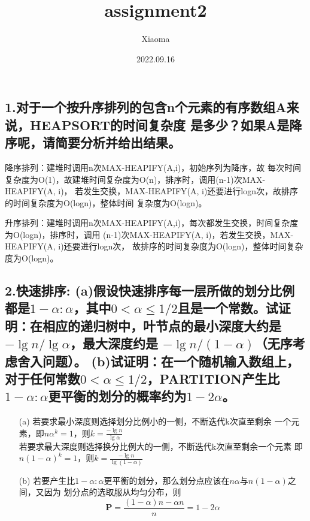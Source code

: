 \documentclass[12pt, a4paper, oneside]{ctexart}
\title{assignment2}
\author{Xiaoma}
\date{2022.09.16}
\begin{document}
\maketitle
\subsection*{1.对于一个按升序排列的包含n个元素的有序数组A来说，HEAPSORT的时间复杂度
是多少？如果A是降序呢，请简要分析并给出结果。}
    降序排列：建堆时调用n次MAX-HEAPIFY(A,i)，初始序列为降序，故
    每次时间复杂度为O(1)，故建堆时间复杂度为O(n)，排序时，调用(n-1)次MAX-HEAPIFY(A, i)，
    若发生交换，MAX-HEAPIFY(A, i)还要进行logn次，故排序的时间复杂度为O(logn)，整体时间
    复杂度为O(logn)。\\
    \par
    升序排列：建堆时调用n次MAX-HEAPIFY(A,i)，每次都发生交换，时间复杂度为O(logn)，排序时，调用
    (n-1)次MAX-HEAPIFY(A, i)，若发生交换，MAX-HEAPIFY(A, i)还要进行logn次，
    故排序的时间复杂度为O(logn)，整体时间复杂度为O(logn)。

\subsection*{2.快速排序:
    (a)假设快速排序每一层所做的划分比例都是$1-\alpha:\alpha$，其中$0<\alpha \leqslant 1/2$且是一个常数。试证明：在相应的递归树中，叶节点的最小深度大约是$-\lg n/ \lg \alpha$，最大深度约是 $-\lg n / (1-\alpha)$（无序考虑舍入问题）。
    (b)试证明：在一个随机输入数组上，对于任何常数$0<\alpha \leqslant 1/2$，PARTITION产生比$1-\alpha:\alpha$更平衡的划分的概率约为$1-2\alpha$。}
    \begin{itemize}
        \item [(a)] 若要求最小深度则选择划分比例小的一侧，不断迭代k次直至剩余
        一个元素，即$n\alpha ^{k}=1$，则$k=\frac{-\lg n}{\lg \alpha} $\\
        若要求最大深度则选择换分比例大的一侧，不断迭代k次直至剩余一个元素
        即$n(1-\alpha)^{k}=1$，则$k=\frac{-\lg n}{\lg(1-\alpha)}$\\
        \item [(b)] 若要产生比$1-\alpha:\alpha$更平衡的划分，那么划分点应该在$n\alpha$与$n(1-\alpha)$之间，又因为
        划分点的选取服从均匀分布，则$$\mathbf{P} =\frac{(1-\alpha)n-\alpha n}{n}=1-2\alpha $$
    \end{itemize}
\end{document}
